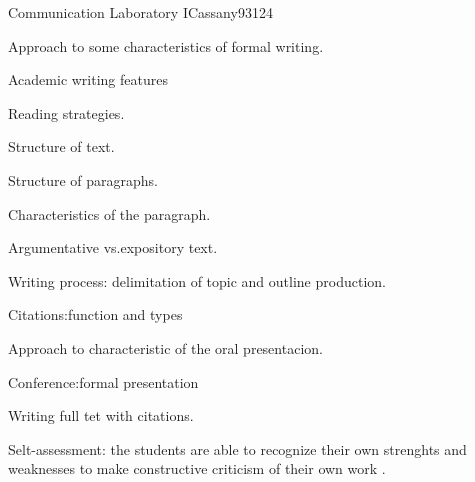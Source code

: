 \begin{syllabus}
\begin{competences}
    \item {}
    \item {}
    \item {}
\end{competences}

\begin{unit}{Communication Laboratory I}{}{Cassany93}{12}{4}
   \begin{topics}
      \item Approach to some characteristics of formal writing.
      \item Academic writing features
      \item Reading strategies.
      \item Structure of text.
      \item Structure of paragraphs.
      \item Characteristics of the paragraph.
      \item Argumentative vs.expository text.
      \item Writing process: delimitation of topic and outline production.
      \item Citations:function and types
      \item Approach to characteristic of the oral presentacion.
      \item Conference:formal presentation
      \item Writing full tet with citations.
   \end{topics}
   \begin{learningoutcomes}
      \item Selt-assessment: the students are able to recognize their own strenghts and weaknesses to make constructive criticism of their own work .
   \end{learningoutcomes}
\end{unit}

\begin{coursebibliography}
\end{coursebibliography}

\end{syllabus}
